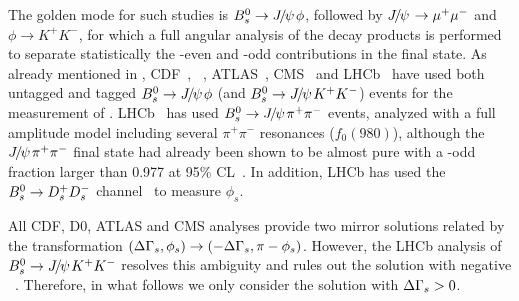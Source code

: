 The golden mode for such studies is 
$B^0_s \to {J\mskip -3mu/\mskip -2mu\psi\mskip 2mu}\phi$, followed by ${J\mskip -3mu/\mskip -2mu\psi\mskip 2mu} \to \mu^+\mu^-$ and 
$\phi\to K^+K^-$, for which a full angular 
analysis of the decay products is performed to 
separate statistically the \CP-even and \CP-odd
contributions in the final state. As already mentioned in 
,
CDF~\cite{Aaltonen:2012ie,*CDF:2011af,*Aaltonen:2007he_mod,*Aaltonen:2007gf_mod},
\dzero~\cite{Abazov:2011ry,*Abazov_mod:2008fj,*Abazov:2007tx_mod_cont},
ATLAS~\cite{Aad:2014cqa,*Aad:2012kba_cont}, CMS~\cite{CMS-PAS-BPH-13-012}
and LHCb~\cite{LHCB-PAPER-2014-059,*Aaij:2013oba_supersede2}
have used both untagged and tagged $B^0_s \to {J\mskip -3mu/\mskip -2mu\psi\mskip 2mu}\phi$ (and $B^0_s \to {J\mskip -3mu/\mskip -2mu\psi\mskip 2mu} K^+K^-$) events 
for the measurement of \phiccbars.
LHCb~\cite{Aaij:2014dka,*Aaij:2013oba_supersede}
has used $B^0_s \to {J\mskip -3mu/\mskip -2mu\psi\mskip 2mu} \pi^+\pi^-$ events, 
analyzed with a full amplitude model
including several $\pi^+\pi^-$ resonances (\eg $f_0(980)$),
although the
${J\mskip -3mu/\mskip -2mu\psi\mskip 2mu} \pi^+\pi^-$ final state had already been shown
to be almost \CP pure with a \CP-odd fraction
larger than 0.977 at 95\% CL~\cite{LHCb:2012ae}. 
In addition, LHCb has used the $B^0_s \to D^+_sD^-_s$ channel~\cite{Aaij:2014ywt} to measure $\phi_s$.

All CDF, D0, ATLAS and CMS analyses provide 
two mirror solutions related by the transformation 
$(\Delta\Gamma_{s}, \phi_s) \to (-\Delta\Gamma_{s}, \pi-\phi_s)$. However, the
LHCb analysis of $B^0_s \to {J\mskip -3mu/\mskip -2mu\psi\mskip 2mu} K^+K^-$ resolves this ambiguity and 
rules out the solution with negative \DGs~\cite{Aaij:2012eq}.
Therefore, in what follows we only consider the solution with $\Delta\Gamma_{s} > 0$.


